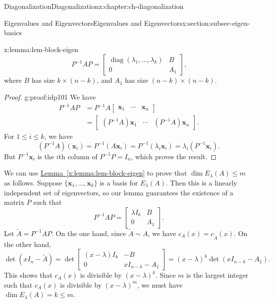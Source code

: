 \documentclass[oneside,10pt,]{book}
\newcommand{\xreffont}{\relax}
\numberwithin{equation}{section}
\newcommand{\bbm}{\begin{bmatrix}}
\newcommand{\ebm}{\end{bmatrix}}
\newcommand{\diag}{\operatorname{diag}}
\newcommand{\xx}{\mathbf{x}}
\newcommand{\amp}{&}
\begin{document}
\begin{chapterptx}{Diagonalization}{}{Diagonalization}{}{}{x:chapter:ch-diagonalization}
\begin{sectionptx}{Eigenvalues and Eigenvectors}{}{Eigenvalues and Eigenvectors}{}{}{x:section:subsec-eigen-basics}
\begin{lemma}{}{}{x:lemma:lem-block-eigen}
\begin{equation*}
P^{-1}AP = \bbm \diag(\lambda_1,\ldots, \lambda_k) \amp B\\0\amp A_1\ebm\text{,}
\end{equation*}
where \(B\) has size \(k\times (n-k)\), and \(A_1\) has size \((n-k)\times (n-k)\).%
\end{lemma}
\begin{proof}{}{g:proof:idp101}
We have%
\begin{align*}
P^{-1}AP \amp = P^{-1}A\bbm \xx_1\amp \cdots \amp \xx_n\ebm\\
\amp =\bbm (P^{-1}A)\xx_1\amp \cdots \amp (P^{-1}A)\xx_n\ebm\text{.}
\end{align*}
For \(1\leq i\leq k\), we have%
\begin{equation*}
(P^{-1}A)(\xx_i) = P^{-1}(A\xx_i) = P^{-1}(\lambda_i\xx_i)=\lambda_i(P^{-1}\xx_i)\text{.}
\end{equation*}
But \(P^{-1}\xx_i\) is the \(i\)th column of \(P^{-1}P = I_n\), which proves the result.%
\end{proof}
We can use \hyperref[x:lemma:lem-block-eigen]{Lemma~{\xreffont\ref{x:lemma:lem-block-eigen}}} to prove that \(\dim E_\lambda(A)\leq m\) as follows. Suppose \(\{\xx_1,\ldots, \xx_k\}\) is a basis for \(E_\lambda(A)\). Then this is a linearly independent set of eigenvectors, so our lemma guarantees the existence of a matrix \(P\) such that%
\begin{equation*}
P^{-1}AP = \bbm \lambda I_k \amp B\\0\amp A_1\ebm\text{.}
\end{equation*}
Let \(\tilde{A}=P^{-1}AP\). On the one hand, since \(\tilde{A}\sim A\), we have \(c_A(x)=c_{\tilde{A}}(x)\). On the other hand,%
\begin{equation*}
\det(xI_n-\tilde{A}) = \det\bbm (x-\lambda)I_k \amp -B\\0 \amp xI_{n-k}-A_1\ebm = (x-\lambda)^k\det(xI_{n-k}-A_1)\text{.}
\end{equation*}
This shows that \(c_A(x)\) is divisible by \((x-\lambda)^k\). Since \(m\) is the largest integer such that \(c_A(x)\) is divisible by \((x-\lambda)^m\), we must have \(\dim E_\lambda(A)=k\leq m\).%
\par

\end{sectionptx}
\end{chapterptx}
\end{document}
